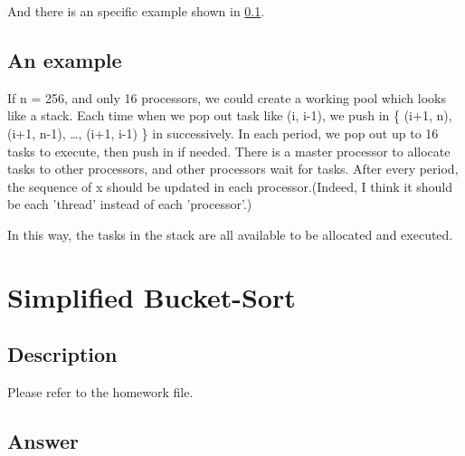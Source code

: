 \documentclass[a4paper]{article}   %
\begin{document}
\begin{CJK}{UTF8}{gbsn}
\begin{spacing}{1.2}
And there is an specific example shown in \ref{example}.



\subsection{An example} \label{example}

If n = 256, and only 16 processors, we could create a working pool which looks like a stack. Each time when we pop out task like (i, i-1), we push in \{ (i+1, n), (i+1, n-1), \dots, (i+1, i-1) \} in successively. In each period, we pop out up to 16 tasks to execute, then push in if needed. There is a master processor to allocate tasks to other processors, and other processors wait for tasks. After every period, the sequence of x should be updated in each processor.(Indeed, I think it should be each 'thread' instead of each 'processor'.)

In this way, the tasks in the stack are all available to be allocated and executed. 

\section{Simplified Bucket-Sort\label{problem2}}
\subsection{Description}
Please refer to the homework file. 

\subsection{Answer}

\end{spacing}
\end{CJK}
\end{document}
